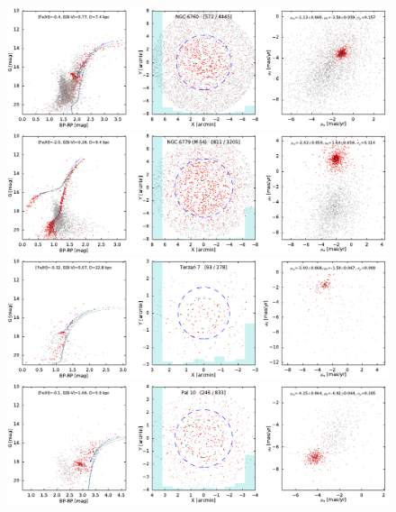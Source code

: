 \documentclass[usenatbib]{mnras}
\begin{document}
\clearpage\begin{figure}
\contcaption{}
\includegraphics{figs/NGC_6760.pdf}
\includegraphics{figs/NGC_6779_M_56.pdf}
\includegraphics{figs/Terzan_7.pdf}
\includegraphics{figs/Pal_10.pdf}
\end{figure}
\end{document}
